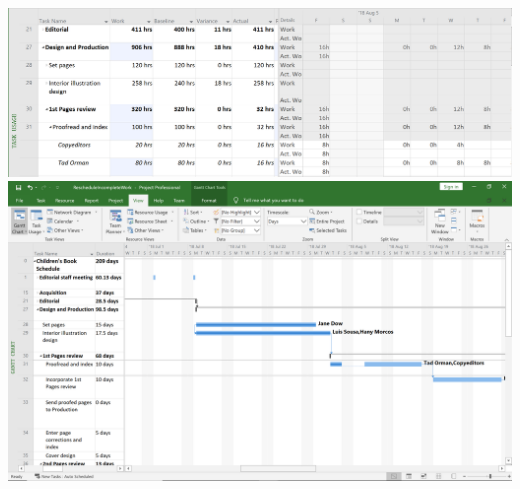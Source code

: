 \documentclass[11pt]{article}
\begin{document}
\includegraphics[scale=0.4]{p4-1.png}
\includegraphics[scale=0.35]{p4-2.png}
\end{document}
